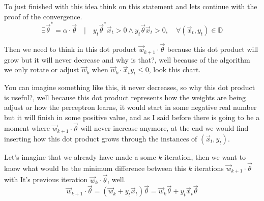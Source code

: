 \documentclass[12pt]{article}
\begin{document}
To just finished with this idea think on this statement
and lets continue with the proof of the convergence.
\[
  \exists \vec{\theta}^* = \alpha \cdot \vec{\theta}\quad|\quad
  y_t\vec{\theta}^*\vec{x}_t > 0 \wedge
  y_t\vec{\theta}\vec{x}_t > 0,
  \quad \forall(\vec{x}_t, y_t)
  \in \mathbb{D}
\]

Then we need to think in this
dot product $\vec{w}_{k + 1} \cdot \vec{\theta}$ because this dot product
will grow but it will never decrease and why is that?, well because of the algorithm we only
rotate or adjust $\vec{w}_{k}$ when $\vec{w}_k \cdot \vec{x}_ty_t \le 0$, look this chart.
\begin{center}
\end{center}
You can imagine something like this, it never decreases, so why this dot product is useful?, well
because this dot product represents how the weights are being adjust or how the perceptron learns,
it would start in some negative real number but it will finish in some positive value,
and as I said before there is going to be a moment where $\vec{w}_{k+1} \cdot \vec{\theta}$
will never increase
anymore, at the end we would find inserting how this dot product grows through
the instances of $(\vec{x}_t, y_t)$.
\begin{center}
\end{center}
Let's imagine that we already have made a some $k$ iteration,
then we want to know what would be 
the minimum difference between this $k$ iterations $\vec{w}_{k+1} \cdot \vec{\theta}$ with It's
previous iteration $\vec{w}_{k} \cdot \vec{\theta}$, well.
\[
  \vec{w}_{k + 1} \cdot \vec{\theta} = (\vec{w}_{k} + y_t\vec{x}_t) \vec{\theta}
  = \vec{w}_{k}\vec{\theta} + y_t\vec{x}_t\vec{\theta}
\]
\end{document}
